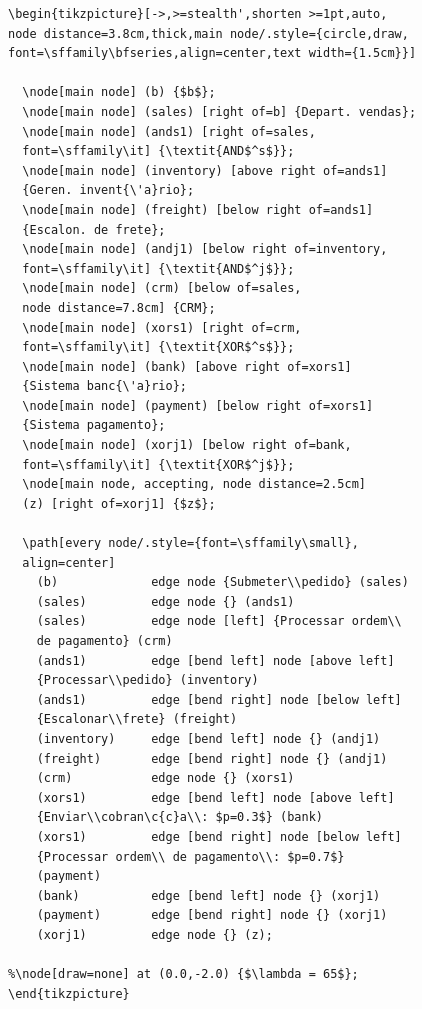 \begin{verbatim}
\begin{tikzpicture}[->,>=stealth',shorten >=1pt,auto,
node distance=3.8cm,thick,main node/.style={circle,draw,
font=\sffamily\bfseries,align=center,text width={1.5cm}}]

  \node[main node] (b) {$b$};
  \node[main node] (sales) [right of=b] {Depart. vendas};
  \node[main node] (ands1) [right of=sales,
  font=\sffamily\it] {\textit{AND$^s$}};
  \node[main node] (inventory) [above right of=ands1] 
  {Geren. invent{\'a}rio};
  \node[main node] (freight) [below right of=ands1] 
  {Escalon. de frete};
  \node[main node] (andj1) [below right of=inventory,
  font=\sffamily\it] {\textit{AND$^j$}};
  \node[main node] (crm) [below of=sales, 
  node distance=7.8cm] {CRM};
  \node[main node] (xors1) [right of=crm,
  font=\sffamily\it] {\textit{XOR$^s$}};
  \node[main node] (bank) [above right of=xors1] 
  {Sistema banc{\'a}rio};
  \node[main node] (payment) [below right of=xors1] 
  {Sistema pagamento};
  \node[main node] (xorj1) [below right of=bank,
  font=\sffamily\it] {\textit{XOR$^j$}};
  \node[main node, accepting, node distance=2.5cm] 
  (z) [right of=xorj1] {$z$};

  \path[every node/.style={font=\sffamily\small},
  align=center]
    (b) 			edge node {Submeter\\pedido} (sales)
    (sales) 		edge node {} (ands1)
    (sales) 		edge node [left] {Processar ordem\\ 
    de pagamento} (crm)
    (ands1) 		edge [bend left] node [above left]
    {Processar\\pedido} (inventory)
    (ands1) 		edge [bend right] node [below left] 
    {Escalonar\\frete} (freight)
    (inventory) 	edge [bend left] node {} (andj1)
    (freight) 		edge [bend right] node {} (andj1)
    (crm) 			edge node {} (xors1)
    (xors1) 		edge [bend left] node [above left] 
    {Enviar\\cobran\c{c}a\\: $p=0.3$} (bank)
    (xors1) 		edge [bend right] node [below left] 
    {Processar ordem\\ de pagamento\\: $p=0.7$} 
    (payment)
    (bank) 			edge [bend left] node {} (xorj1)
    (payment) 		edge [bend right] node {} (xorj1)
    (xorj1) 		edge node {} (z);
    
%\node[draw=none] at (0.0,-2.0) {$\lambda = 65$};
\end{tikzpicture}
\end{verbatim}
 

